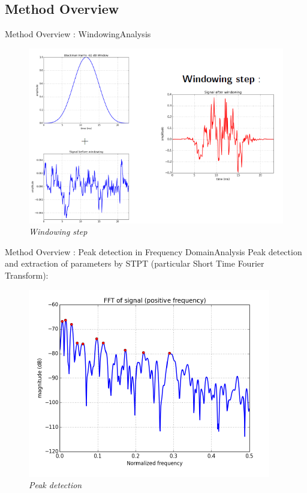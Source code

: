 \documentclass{bredelebeamer}
\begin{document}
\subsection{Method Overview}
\begin{frame}{Method Overview : Windowing}{Analysis}
\begin{figure}
	\centerline
	{\includegraphics[scale=0.4]{slide1.png}}
	\caption{\it Windowing step}
\end{figure}
\end{frame}

\begin{frame}{Method Overview : Peak detection in Frequency Domain}{Analysis}
Peak detection and extraction of parameters by STPT (particular Short Time Fourier Transform):
\begin{figure}
	\centerline
	{\includegraphics[scale=0.5]{slide2.png}}
	\caption{\it Peak detection}
\end{figure}
\end{frame}
\end{document}
